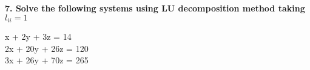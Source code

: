 \documentclass{report}
\begin{document}
\textbf{7. Solve the following systems using LU decomposition method taking $l_{ii} = 1$}
\begin{center}    
    x + 2y + 3z = 14\\
    2x + 20y + 26z = 120\\
    3x + 26y + 70z = 265\\
\end{center}
\solve{

}
\end{document}
